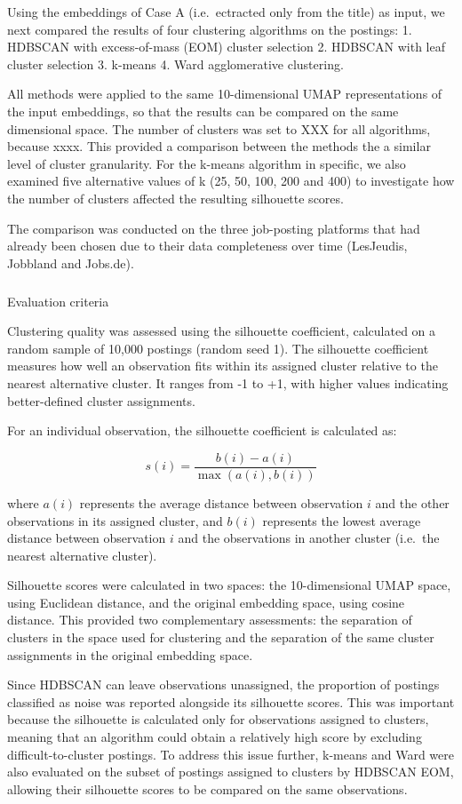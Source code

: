 \documentclass[
  letterpaper,
  DIV=11,
  numbers=noendperiod,
  sfdefaults=false]{scrartcl}
\makeatletter
\let\oldsubparagraph\subparagraph
\renewcommand{\subparagraph}{
    \@ifstar
      \xxxSubParagraphStar
      \xxxSubParagraphNoStar
  }
\newcommand{\xxxSubParagraphStar}[1]{\oldsubparagraph*{#1}\mbox{}}
\newcommand{\xxxSubParagraphNoStar}[1]{\oldsubparagraph{#1}\mbox{}}
\makeatother
\begin{document}
Using the embeddings of Case A (i.e.~ectracted only from the title) as
input, we next compared the results of four clustering algorithms on the
postings: 1. HDBSCAN with excess-of-mass (EOM) cluster selection 2.
HDBSCAN with leaf cluster selection 3. k-means 4. Ward agglomerative
clustering.

All methods were applied to the same 10-dimensional UMAP representations
of the input embeddings, so that the results can be compared on the same
dimensional space. The number of clusters was set to XXX for all
algorithms, because xxxx. This provided a comparison between the methods
the a similar level of cluster granularity. For the k-means algorithm in
specific, we also examined five alternative values of k (25, 50, 100,
200 and 400) to investigate how the number of clusters affected the
resulting silhouette scores.

The comparison was conducted on the three job-posting platforms that had
already been chosen due to their data completeness over time (LesJeudis,
Jobbland and Jobs.de).

\subparagraph{Evaluation criteria}\label{evaluation-criteria}

Clustering quality was assessed using the silhouette coefficient,
calculated on a random sample of 10,000 postings (random seed 1). The
silhouette coefficient measures how well an observation fits within its
assigned cluster relative to the nearest alternative cluster. It ranges
from -1 to +1, with higher values indicating better-defined cluster
assignments.

For an individual observation, the silhouette coefficient is calculated
as:

\[
s(i) = \frac{b(i)-a(i)}{\max(a(i),b(i))}
\]

where \(a(i)\) represents the average distance between observation \(i\)
and the other observations in its assigned cluster, and \(b(i)\)
represents the lowest average distance between observation \(i\) and the
observations in another cluster (i.e.~the nearest alternative cluster).

Silhouette scores were calculated in two spaces: the 10-dimensional UMAP
space, using Euclidean distance, and the original embedding space, using
cosine distance. This provided two complementary assessments: the
separation of clusters in the space used for clustering and the
separation of the same cluster assignments in the original embedding
space.

Since HDBSCAN can leave observations unassigned, the proportion of
postings classified as noise was reported alongside its silhouette
scores. This was important because the silhouette is calculated only for
observations assigned to clusters, meaning that an algorithm could
obtain a relatively high score by excluding difficult-to-cluster
postings. To address this issue further, k-means and Ward were also
evaluated on the subset of postings assigned to clusters by HDBSCAN EOM,
allowing their silhouette scores to be compared on the same
observations.
\end{document}
